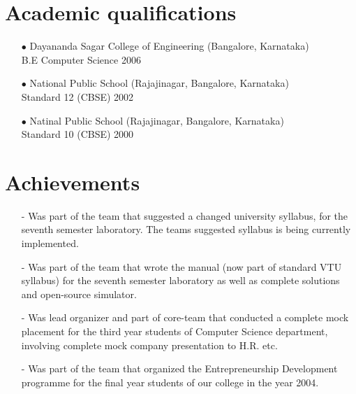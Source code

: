 \documentclass[a4paper,11pt]{article}
\begin{document}
\section{Academic qualifications}

\begin{itemize}
  \item[\footnotesize$\bullet$] Dayananda Sagar College of Engineering (Bangalore,
  Karnataka)\\ B.E Computer Science \hfill 2006
  \item[\footnotesize$\bullet$] National Public School (Rajajinagar, Bangalore,
  Karnataka)\\ Standard 12 (CBSE) \hfill 2002
  \item[\footnotesize$\bullet$] Natinal Public School (Rajajinagar, Bangalore,
  Karnataka)\\ Standard 10 (CBSE) \hfill 2000
\end{itemize}

\section{Achievements}

\begin{itemize}

  \item[-] Was part of the team that suggested a changed university syllabus, for the seventh semester laboratory. The teams suggested syllabus is being currently implemented.
  \item[-] Was part of the team that wrote the manual (now part of
  standard VTU syllabus) for the seventh
  semester laboratory as well as complete solutions and open-source
  simulator.
  \item[-] Was lead organizer and part of core-team that conducted a complete mock placement for the third year students of Computer Science department, involving complete mock company presentation to H.R. etc.
  \item[-] Was part of the team that organized the Entrepreneurship Development programme for the final year students of our college in the year 2004.
\end{itemize}
\end{document}
